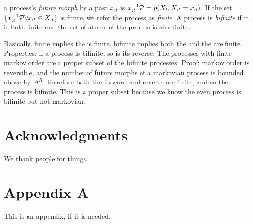 \documentclass[prl,twocolumn,showpacs,superscriptaddress,preprintnumbers,floatfix]{revtex4-1}
\theoremstyle{plain}    \newtheorem{Lem}{Lemma}
\theoremstyle{plain}    \newtheorem*{ProLem}{Proof}
\theoremstyle{plain}    \newtheorem{Cor}{Corollary}
\theoremstyle{plain}    \newtheorem*{ProCor}{Proof}
\theoremstyle{plain}    \newtheorem{The}{Theorem}
\theoremstyle{plain}    \newtheorem*{ProThe}{Proof}
\theoremstyle{plain}    \newtheorem{Prop}{Proposition}
\theoremstyle{plain}    \newtheorem*{ProProp}{Proof}
\theoremstyle{plain}    \newtheorem*{Conj}{Conjecture}
\theoremstyle{plain}    \newtheorem*{Rem}{Remark}
\theoremstyle{plain}    \newtheorem{Def}{Definition}
\theoremstyle{plain}    \newtheorem*{Not}{Notation}
\begin{document}
a process's \emph{future morph} by a past $x_{:t}$ is $x_{:t}^{-1}\mathcal{P} =
p(X_{t:} | X_{:t} = x_{:t})$. If the set $\{ x_{:t}^{-1}\mathcal{P} \forall x_{:t}
\in X_{:t} \}$ is finite, we refer the process as \emph{finite}. A process is
\emph{bifinite} if it is both finite and the set of atoms of the process is also
finite.

Basically, finite implies the \eM is finite. bifinite implies both the
\eM and the \eT are finite. Properties: if a process is bifinite, so
is its reverse. The processes with finite markov order are a proper subset of
the bifinite processes. Proof: markov order is reversible, and the number of
future morphs of a markovian process is bounded above by $\mathcal{A}^R$.
therefore both the forward and reverse \eMs are finite, and so the
process is bifinite. This is a proper subset because we know the even process is
bifinite but not markovian.

\section*{Acknowledgments}
\label{sec:acknowledgments}

We thank people for things.



\cleardoublepage

\appendix

\section{Appendix A}
\label{sec:appendix_a}

This is an appendix, if it is needed.
\end{document}
